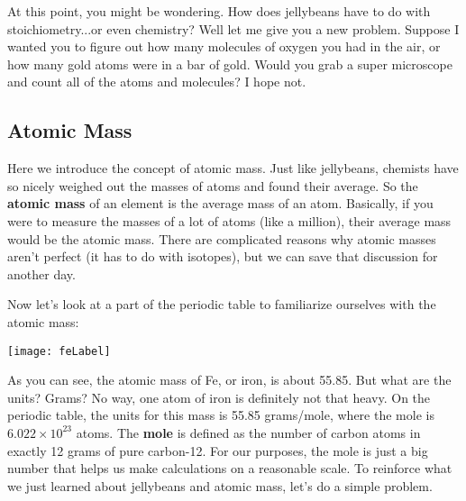 At this point, you might be wondering. How does jellybeans have to do with stoichiometry...or even chemistry? Well let me give you a new problem. Suppose I wanted you to figure out how many molecules of oxygen you had in the air, or how many gold atoms were in a bar of gold. Would you grab a super microscope and count all of the atoms and molecules? I hope not.

\subsection{Atomic Mass}
Here we introduce the concept of atomic mass. Just like jellybeans, chemists have so nicely weighed out the masses of atoms and found their average. So the \textbf{atomic mass} of an element is the average mass of an atom. Basically, if you were to measure the masses of a lot of atoms (like a million), their average mass would be the atomic mass. There are complicated reasons why atomic masses aren't perfect (it has to do with isotopes), but we can save that discussion for another day. 

Now let's look at a part of the periodic table to familiarize ourselves with the atomic mass:
\begin{center}
\texttt{[image: feLabel]}
\end{center}
As you can see, the atomic mass of Fe, or iron, is about 55.85. But what are the units? Grams? No way, one atom of iron is definitely not that heavy. On the periodic table, the units for this mass is 55.85 grams/mole, where the mole is $6.022 \times 10^{23}$ atoms. The \textbf{mole} is defined as the number of carbon atoms in exactly 12 grams of pure carbon-12. For our purposes, the mole is just a big number that helps us make calculations on a reasonable scale. To reinforce what we just learned about jellybeans and atomic mass, let's do a simple problem. 

